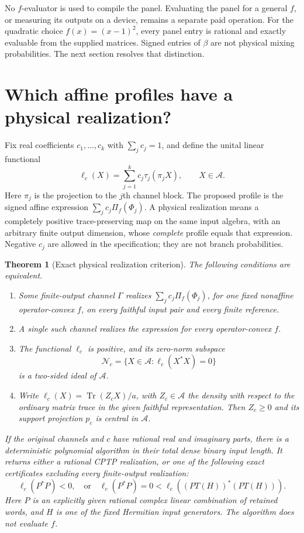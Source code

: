 \documentclass[11pt,a4paper]{article}
\newtheorem{theorem}{Theorem}[section]
\theoremstyle{definition}\newtheorem{definition}[theorem]{Definition}
\newcommand{\Tr}{\operatorname{Tr}}
\newcommand{\Alg}{\mathcal A}
\newcommand{\Nul}{\mathcal N}
\begin{document}
No $f$-evaluator is used to compile the panel. Evaluating the panel for a general $f$, or measuring its outputs on a device, remains a separate paid operation. For the quadratic choice $f(x)=(x-1)^2$, every panel entry is rational and exactly evaluable from the supplied matrices. Signed entries of $\beta$ are not physical mixing probabilities. The next section resolves that distinction.
\section{Which affine profiles have a physical realization?}\label{sec:realization}

Fix real coefficients $c_1,\ldots,c_k$ with $\sum_jc_j=1$, and define the unital linear functional
\begin{equation}\label{eq:ell}
 \ell_c(X)=\sum_{j=1}^k c_j\tau_j(\pi_jX),\qquad X\in\Alg.
\end{equation}
Here $\pi_j$ is the projection to the $j$th channel block. The proposed profile is the signed affine expression $\sum_jc_j\Pi_f(\Phi_j)$. A physical realization means a completely positive trace-preserving map on the same input algebra, with an arbitrary finite output dimension, whose \emph{complete} profile equals that expression. Negative $c_j$ are allowed in the specification; they are not branch probabilities.

\begin{theorem}[Exact physical realization criterion]\label{thm:realization}
The following conditions are equivalent.
\begin{enumerate}
\item Some finite-output channel $\Gamma$ realizes $\sum_jc_j\Pi_f(\Phi_j)$, for one fixed nonaffine operator-convex $f$, on every faithful input pair and every finite reference.
\item A single such channel realizes the expression for every operator-convex $f$.
\item The functional $\ell_c$ is positive, and its zero-norm subspace
\begin{equation}\label{eq:null}
 \Nul_c=\{X\in\Alg:\ell_c(X^*X)=0\}
\end{equation}
is a two-sided ideal of $\Alg$.
\item Write $\ell_c(X)=\Tr(Z_cX)/a$, with $Z_c\in\Alg$ the density with respect to the ordinary matrix trace in the given faithful representation. Then $Z_c\ge0$ and its support projection $p_c$ is central in $\Alg$.
\end{enumerate}
If the original channels and $c$ have rational real and imaginary parts, there is a deterministic polynomial algorithm in their total dense binary input length. It returns either a rational CPTP realization, or one of the following exact certificates excluding \emph{every} finite-output realization:
\[
 \ell_c(P^*P)<0,
 \quad\text{or}\quad
 \ell_c(P^*P)=0<\ell_c((PT(H))^*(PT(H))).
\]
Here $P$ is an explicitly given rational complex linear combination of retained words, and $H$ is one of the fixed Hermitian input generators. The algorithm does not evaluate $f$.
\end{theorem}
\end{document}
